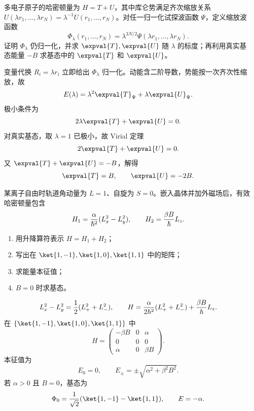 \begin{question}
多电子原子的哈密顿量为 $H=T+U$，其中库仑势满足齐次缩放关系 $U(\lambda r_1,\ldots,\lambda r_N)=\lambda^{-1}U(r_1,\ldots, r_N)$。对任一归一化试探波函数 $\Psi$，定义缩放波函数
\[
  \Phi_\lambda(r_1,\ldots, r_N)=\lambda^{3N/2}\Psi(\lambda r_1,\ldots,\lambda r_N).
\]
证明 $\Phi_\lambda$ 仍归一化，并求 $\expval{T},\expval{U}$ 随 $\lambda$ 的标度；再利用真实基态能量 $-B$ 求基态中的 $\expval{T}$ 和 $\expval{U}$。
\begin{solution}
变量代换 $R_i=\lambda r_i$ 立即给出 $\Phi_\lambda$ 归一化。动能含二阶导数，势能按一次齐次性缩放，故
\[
  E(\lambda)=\lambda^2\expval{T}_\Psi+\lambda\expval{U}_\Psi.
\]
极小条件为
\[
  2\lambda\expval{T}+\expval{U}=0.
\]
对真实基态，取 $\lambda=1$ 已极小，故 Virial 定理
\[
  2\expval{T}+\expval{U}=0.
\]
又 $\expval{T}+\expval{U}=-B$，解得
\[
  \expval{T}=B,
  \qquad \expval{U}=-2B.
\]
\end{solution}
\end{question}

\begin{question}
某离子自由时轨道角动量为 $L=1$、自旋为 $S=0$。嵌入晶体并加外磁场后，有效哈密顿量包含
\[
  H_1={\alpha\over\hbar^2}(L_x^2-L_y^2),
  \qquad H_2={\beta B\over\hbar}L_z.
\]
\begin{enumerate}
  \item 用升降算符表示 $H=H_1+H_2$；
  \item 写出在 $\ket{1,-1},\ket{1,0},\ket{1,1}$ 中的矩阵；
  \item 求能量本征值；
  \item $B=0$ 时求基态。
\end{enumerate}
\begin{solution}
\[
  L_x^2-L_y^2={1\over2}(L_+^2+L_-^2),
  \qquad H={\alpha\over2\hbar^2}(L_+^2+L_-^2)+{\beta B\over\hbar}L_z.
\]
在 $\{\ket{1,-1},\ket{1,0},\ket{1,1}\}$ 中
\[
  H=\begin{pmatrix}
  -\beta B&0&\alpha\\
  0&0&0\\
  \alpha&0&\beta B
  \end{pmatrix}.
\]
本征值为
\[
  E_0=0,
  \qquad E_\pm=\pm\sqrt{\alpha^2+\beta^2B^2}.
\]
若 $\alpha>0$ 且 $B=0$，基态为
\[
  \Phi_0={1\over\sqrt2}(\ket{1,-1}-\ket{1,1}),
  \qquad E=-\alpha.
\]
\end{solution}
\end{question}

